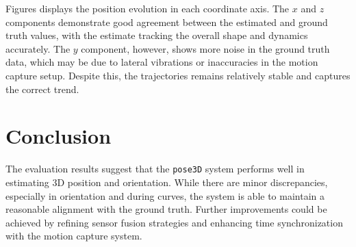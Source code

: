 \documentclass[11pt]{article}
\begin{document}
\FloatBarrier %

Figures displays the position evolution in each coordinate axis. The $x$ and $z$ components demonstrate good agreement between the estimated and ground truth values, with the estimate tracking the overall shape and dynamics accurately. The $y$ component, however, shows more noise in the ground truth data, which may be due to lateral vibrations or inaccuracies in the motion capture setup. Despite this, the  trajectories remains relatively stable and captures the correct trend.

\section{Conclusion}

The evaluation results suggest that the \texttt{pose3D} system performs well in estimating 3D position and orientation. While there are minor discrepancies, especially in orientation and during curves, the system is able to maintain a reasonable alignment with the ground truth. Further improvements could be achieved by refining sensor fusion strategies and enhancing time synchronization with the motion capture system.
\end{document}
